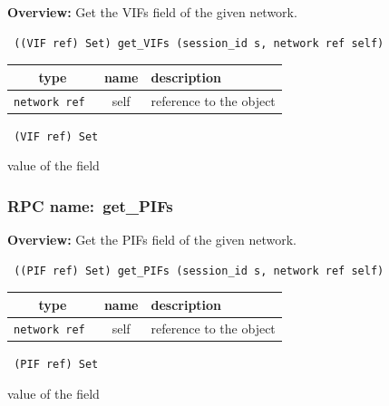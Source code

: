 {\bf Overview:} 
Get the VIFs field of the given network.

\begin{verbatim} ((VIF ref) Set) get_VIFs (session_id s, network ref self)\end{verbatim}



 
\vspace{0.3cm}
\begin{tabular}{|c|c|p{7cm}|}
 \hline
{\bf type} & {\bf name} & {\bf description} \\ \hline
{\tt network ref } & self & reference to the object \\ \hline 

\end{tabular}

\vspace{0.3cm}

{\tt 
(VIF ref) Set
}


value of the field
\vspace{0.3cm}
\vspace{0.3cm}
\vspace{0.3cm}
\subsubsection{RPC name:~get\_PIFs}

{\bf Overview:} 
Get the PIFs field of the given network.

\begin{verbatim} ((PIF ref) Set) get_PIFs (session_id s, network ref self)\end{verbatim}



 
\vspace{0.3cm}
\begin{tabular}{|c|c|p{7cm}|}
 \hline
{\bf type} & {\bf name} & {\bf description} \\ \hline
{\tt network ref } & self & reference to the object \\ \hline 

\end{tabular}

\vspace{0.3cm}

{\tt 
(PIF ref) Set
}


value of the field
\vspace{0.3cm}
\vspace{0.3cm}
\vspace{0.3cm}
